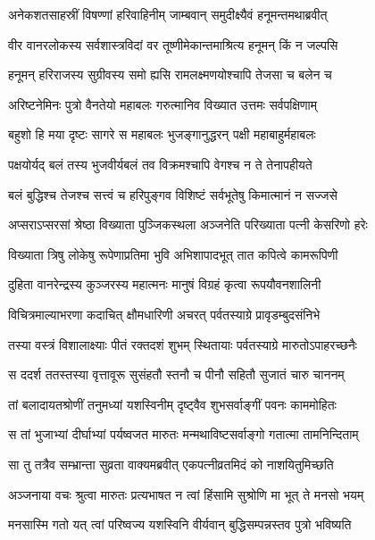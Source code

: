 
\twolineshloka
{अनेकशतसाहस्रीं विषण्णां हरिवाहिनीम्}
{जाम्बवान् समुदीक्ष्यैवं हनूमन्तमथाब्रवीत्} %

\twolineshloka
{वीर वानरलोकस्य सर्वशास्त्रविदां वर}
{तूष्णीमेकान्तमाश्रित्य हनूमन् किं न जल्पसि} %

\twolineshloka
{हनूमन् हरिराजस्य सुग्रीवस्य समो ह्यसि}
{रामलक्ष्मणयोश्चापि तेजसा च बलेन च} %

\twolineshloka
{अरिष्टनेमिनः पुत्रो वैनतेयो महाबलः}
{गरुत्मानिव विख्यात उत्तमः सर्वपक्षिणाम्} %

\twolineshloka
{बहुशो हि मया दृष्टः सागरे स महाबलः}
{भुजङ्गानुद्धरन् पक्षी महाबाहुर्महाबलः} %

\twolineshloka
{पक्षयोर्यद् बलं तस्य भुजवीर्यबलं तव}
{विक्रमश्चापि वेगश्च न ते तेनापहीयते} %

\twolineshloka
{बलं बुद्धिश्च तेजश्च सत्त्वं च हरिपुङ्गव}
{विशिष्टं सर्वभूतेषु किमात्मानं न सज्जसे} %

\twolineshloka
{अप्सराऽप्सरसां श्रेष्ठा विख्याता पुञ्जिकस्थला}
{अञ्जनेति परिख्याता पत्नी केसरिणो हरेः} %

\twolineshloka
{विख्याता त्रिषु लोकेषु रूपेणाप्रतिमा भुवि}
{अभिशापादभूत् तात कपित्वे कामरूपिणी} %

\twolineshloka
{दुहिता वानरेन्द्रस्य कुञ्जरस्य महात्मनः}
{मानुषं विग्रहं कृत्वा रूपयौवनशालिनी} %

\twolineshloka
{विचित्रमाल्याभरणा कदाचित् क्षौमधारिणी}
{अचरत् पर्वतस्याग्रे प्रावृडम्बुदसंनिभे} %

\twolineshloka
{तस्या वस्त्रं विशालाक्ष्याः पीतं रक्तदशं शुभम्}
{स्थितायाः पर्वतस्याग्रे मारुतोऽपाहरच्छनैः} %

\twolineshloka
{स ददर्श ततस्तस्या वृत्तावूरू सुसंहतौ}
{स्तनौ च पीनौ सहितौ सुजातं चारु चाननम्} %

\twolineshloka
{तां बलादायतश्रोणीं तनुमध्यां यशस्विनीम्}
{दृष्ट्वैव शुभसर्वाङ्गीं पवनः काममोहितः} %

\twolineshloka
{स तां भुजाभ्यां दीर्घाभ्यां पर्यष्वजत मारुतः}
{मन्मथाविष्टसर्वाङ्गो गतात्मा तामनिन्दिताम्} %

\twolineshloka
{सा तु तत्रैव सम्भ्रान्ता सुव्रता वाक्यमब्रवीत्}
{एकपत्नीव्रतमिदं को नाशयितुमिच्छति} %

\twolineshloka
{अञ्जनाया वचः श्रुत्वा मारुतः प्रत्यभाषत}
{न त्वां हिंसामि सुश्रोणि मा भूत् ते मनसो भयम्} %

\twolineshloka
{मनसास्मि गतो यत् त्वां परिष्वज्य यशस्विनि}
{वीर्यवान् बुद्धिसम्पन्नस्तव पुत्रो भविष्यति} %

